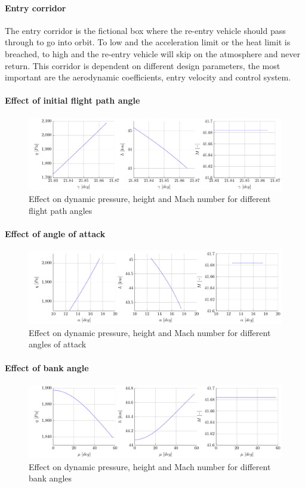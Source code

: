 \paragraph{Entry corridor}

The entry corridor is the fictional box where the re-entry vehicle should pass through to go into orbit. To low and the acceleration limit or the heat limit is breached, to high and the re-entry vehicle will skip on the atmosphere and never return. This corridor is dependent on different design parameters, the most important are the aerodynamic coefficients, entry velocity and control system.

\paragraph{Effect of initial flight path angle}

\begin{figure}[ht!]
	\centering
	\includegraphics[width=\textwidth]{./Figure/orbit/effectgamma.pdf}
	\caption{Effect on dynamic pressure, height and Mach number for different flight path angles}
	\label{fig:effectgamma}
\end{figure}

\paragraph{Effect of angle of attack}

\begin{figure}[ht!]
	\centering
	\includegraphics[width=\textwidth]{./Figure/orbit/effectalpha.pdf}
	\caption{Effect on dynamic pressure, height and Mach number for different angles of attack}
	\label{fig:effectalpha}
\end{figure}

\paragraph{Effect of bank angle}

\begin{figure}[ht!]
	\centering
	\includegraphics[width=\textwidth]{./Figure/orbit/effectmu.pdf}
	\caption{Effect on dynamic pressure, height and Mach number for different bank angles}
	\label{fig:effectmu}
\end{figure}


